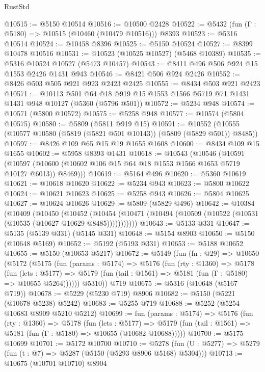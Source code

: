 \begin{lexlean}{RustStd}
\begin{coremodule}
@10515 := @5150 @10514
@10516 := @10500 @2428
@10522 := @5432 (fun (Γ : @5180) => @10515 (@10460 (@10479 @10516))) @8393
@10523 := @5316 @10514
@10524 := @10458 @8396
@10525 := @5150 @10524
@10527 := @8399 @10478 @10516
@10531 := @10523 (@10525 @10527) (@5468 @10389)
@10535 := @5316 @10524 @10527 (@5473 @10457)
@10543 := @8411 @496 @506 @924 @15 @1553 @2426 @1431 @943
@10546 := @8421 @506 @924 @2426
@10552 := @8426 @503 @505 @921 @923 @2423 @2425
@10555 := @8434 @503 @921 @2423
@10571 := @10113
    @501
    @64
    @18
    @919
    @15
    @1553
    @1566
    @5719
    @71
    @1431
    @1431
    @948
    @10127
    (@5360 (@5796 @501))
@10572 := @5234 @948
@10574 := @10571 (@5800 @10572)
@10575 := @5258 @948
@10577 := @10574 (@5804 @10575)
@10580 := @5809 (@5811 @919 @15)
@10591 := @10552 (@10555 (@10577 @10580 (@5819 (@5821 @501 @10143)) (@5809 (@5829 @501)) @8485))
@10597 := @8426 @109 @65 @15 @19 @1655 @1608
@10600 := @8434 @109 @15 @1655
@10602 := @5958 @8393 @1431
@10618 := @10543
    (@10546
      (@10591
        (@10597 (@10600 (@10602 @106 @15 @64 @18 @1553 @1566 @1653 @5719 @10127 @6013)) @8469)))
@10619 := @5164 @496
@10620 := @5360 @10619
@10621 := @10618 @10620
@10622 := @5234 @943
@10623 := @5800 @10622
@10624 := @10621 @10623
@10625 := @5258 @943
@10626 := @5804 @10625
@10627 := @10624 @10626
@10629 := @5809 (@5829 @496)
@10642 := @10384
    (@10409
      (@10450
        (@10452
          (@10454 (@10471 (@10494 (@10509 (@10522 (@10531 (@10535 (@10627 @10629 @8485)))))))))))
@10643 := @5133 @331
@10647 := @5135 (@5139 @331) (@5145 @331)
@10648 := @5154 @8903
@10650 := @5150 (@10648 @5169)
@10652 := @5192 (@5193 @331)
@10653 := @5188 @10652
@10655 := @5150 (@10653 @5217)
@10672 := @5149
    (fun (fn : @29) =>
    @10650
      (@5172
        (@5175
          (fun (params : @5174) =>
          @5176
            (fun (rty : @1360) =>
            @5178
              (fun (lets : @5177) =>
              @5179 (fun (tail : @1561) => @5181 (fun (Γ : @5180) => @10655 @5264))))))
        @5310))
    @719
@10675 := @5316 (@10648 (@5167 @719))
@10678 := @5229 (@5230 @719) @8906
@10682 := @5150 (@5221 (@10678 @5238) @5242)
@10683 := @5255 @719
@10688 := @5252 (@5254 @10683 @8909 @5210 @5212)
@10699 := fun (params : @5174) =>
  @5176
    (fun (rty : @1360) =>
    @5178
      (fun (lets : @5177) =>
      @5179 (fun (tail : @1561) => @5181 (fun (Γ : @5180) => @10655 (@10682 @10688)))))
@10700 := @5175 @10699
@10701 := @5172 @10700
@10710 := @5278 (fun (U : @5277) => @5279 (fun (t : @7) => @5287 (@5150 (@5293 @8906 @5168) @5304)))
@10713 := @10675 (@10701 @10710) @8904

\end{coremodule}
\end{lexlean}

